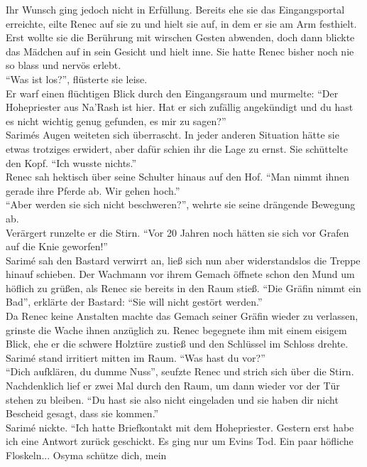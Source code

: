 Ihr Wunsch ging jedoch nicht in Erfüllung. Bereits ehe sie das Eingangsportal erreichte, eilte 
Renec auf sie zu und hielt sie auf, in dem er sie am Arm festhielt. Erst wollte sie die Berührung 
mit wirschen Gesten abwenden, doch dann blickte das Mädchen auf in sein Gesicht und hielt inne. Sie 
hatte Renec bisher noch nie so blass und nervös erlebt. \\
``Was ist los?'', flüsterte sie leise.\\
Er warf einen flüchtigen Blick durch den Eingangsraum und murmelte: ``Der Hohepriester aus Na'Rash 
ist hier. Hat er sich zufällig angekündigt und du hast es nicht wichtig genug gefunden, es mir zu 
sagen?''\\
Sarimés Augen weiteten sich überrascht. In jeder anderen Situation hätte sie etwas trotziges 
erwidert, aber dafür schien ihr die Lage zu ernst. Sie schüttelte den Kopf. ``Ich wusste nichts.''\\
Renec sah hektisch über seine Schulter hinaus auf den Hof. ``Man nimmt ihnen gerade ihre Pferde ab. 
Wir gehen hoch.''\\
``Aber werden sie sich nicht beschweren?'', wehrte sie seine drängende Bewegung ab.\\
Verärgert runzelte er die Stirn. ``Vor 20 Jahren noch hätten sie sich vor Grafen auf die Knie 
geworfen!''\\
Sarimé sah den Bastard verwirrt an, ließ sich nun aber widerstandslos die Treppe hinauf schieben. 
Der Wachmann vor ihrem Gemach öffnete schon den Mund um höflich zu grüßen, als Renec sie bereits 
in den Raum stieß. ``Die Gräfin nimmt ein Bad'', erklärte der Bastard: ``Sie will nicht gestört 
werden.''\\
Da Renec keine Anstalten machte das Gemach seiner Gräfin wieder zu verlassen, grinste die Wache 
ihnen anzüglich zu. Renec begegnete ihm mit einem eisigem Blick, ehe er die schwere Holztüre zustieß 
und den Schlüssel im Schloss drehte. \\
Sarimé stand irritiert mitten im Raum. ``Was hast du vor?''\\
``Dich aufklären, du dumme Nuss'', seufzte Renec und strich sich über die Stirn. Nachdenklich lief 
er zwei Mal durch den Raum, um dann wieder vor der Tür stehen zu bleiben. ``Du hast sie also nicht 
eingeladen und sie haben dir nicht Bescheid gesagt, dass sie kommen.''\\
Sarimé nickte. ``Ich hatte Briefkontakt mit dem Hohepriester. Gestern erst habe ich eine Antwort 
zurück geschickt. Es ging nur um Evins Tod. Ein paar höfliche Floskeln... Osyma schütze dich, mein 
